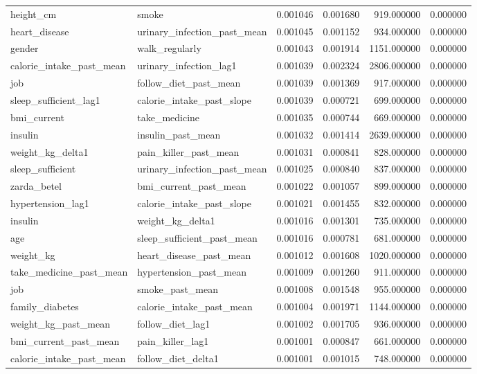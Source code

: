 \begin{longtable}{llrrrr}
height\_cm & smoke & 0.001046 & 0.001680 & 919.000000 & 0.000000 \\
heart\_disease & urinary\_infection\_past\_mean & 0.001045 & 0.001152 & 934.000000 & 0.000000 \\
gender & walk\_regularly & 0.001043 & 0.001914 & 1151.000000 & 0.000000 \\
calorie\_intake\_past\_mean & urinary\_infection\_lag1 & 0.001039 & 0.002324 & 2806.000000 & 0.000000 \\
job & follow\_diet\_past\_mean & 0.001039 & 0.001369 & 917.000000 & 0.000000 \\
sleep\_sufficient\_lag1 & calorie\_intake\_past\_slope & 0.001039 & 0.000721 & 699.000000 & 0.000000 \\
bmi\_current & take\_medicine & 0.001035 & 0.000744 & 669.000000 & 0.000000 \\
insulin & insulin\_past\_mean & 0.001032 & 0.001414 & 2639.000000 & 0.000000 \\
weight\_kg\_delta1 & pain\_killer\_past\_mean & 0.001031 & 0.000841 & 828.000000 & 0.000000 \\
sleep\_sufficient & urinary\_infection\_past\_mean & 0.001025 & 0.000840 & 837.000000 & 0.000000 \\
zarda\_betel & bmi\_current\_past\_mean & 0.001022 & 0.001057 & 899.000000 & 0.000000 \\
hypertension\_lag1 & calorie\_intake\_past\_slope & 0.001021 & 0.001455 & 832.000000 & 0.000000 \\
insulin & weight\_kg\_delta1 & 0.001016 & 0.001301 & 735.000000 & 0.000000 \\
age & sleep\_sufficient\_past\_mean & 0.001016 & 0.000781 & 681.000000 & 0.000000 \\
weight\_kg & heart\_disease\_past\_mean & 0.001012 & 0.001608 & 1020.000000 & 0.000000 \\
take\_medicine\_past\_mean & hypertension\_past\_mean & 0.001009 & 0.001260 & 911.000000 & 0.000000 \\
job & smoke\_past\_mean & 0.001008 & 0.001548 & 955.000000 & 0.000000 \\
family\_diabetes & calorie\_intake\_past\_mean & 0.001004 & 0.001971 & 1144.000000 & 0.000000 \\
weight\_kg\_past\_mean & follow\_diet\_lag1 & 0.001002 & 0.001705 & 936.000000 & 0.000000 \\
bmi\_current\_past\_mean & pain\_killer\_lag1 & 0.001001 & 0.000847 & 661.000000 & 0.000000 \\
calorie\_intake\_past\_mean & follow\_diet\_delta1 & 0.001001 & 0.001015 & 748.000000 & 0.000000 \\

\end{longtable}
